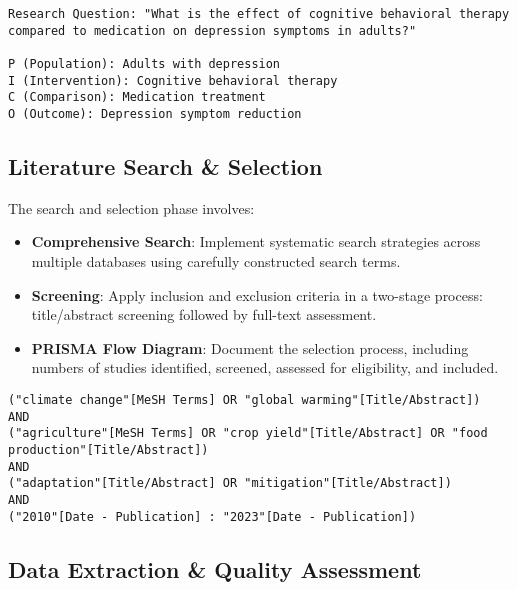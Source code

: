 \begin{infobox}
\begin{lstlisting}
Research Question: "What is the effect of cognitive behavioral therapy compared to medication on depression symptoms in adults?"

P (Population): Adults with depression
I (Intervention): Cognitive behavioral therapy
C (Comparison): Medication treatment
O (Outcome): Depression symptom reduction
\end{lstlisting}
\end{infobox}

\subsection{Literature Search \& Selection}

The search and selection phase involves:

\begin{itemize}
    \item \textbf{Comprehensive Search}: Implement systematic search strategies across multiple databases using carefully constructed search terms.
    \item \textbf{Screening}: Apply inclusion and exclusion criteria in a two-stage process: title/abstract screening followed by full-text assessment.
    \item \textbf{PRISMA Flow Diagram}: Document the selection process, including numbers of studies identified, screened, assessed for eligibility, and included.
\end{itemize}

\begin{infobox}
\begin{lstlisting}
("climate change"[MeSH Terms] OR "global warming"[Title/Abstract])
AND
("agriculture"[MeSH Terms] OR "crop yield"[Title/Abstract] OR "food production"[Title/Abstract])
AND
("adaptation"[Title/Abstract] OR "mitigation"[Title/Abstract])
AND
("2010"[Date - Publication] : "2023"[Date - Publication])
\end{lstlisting}
\end{infobox}

\subsection{Data Extraction \& Quality Assessment}

